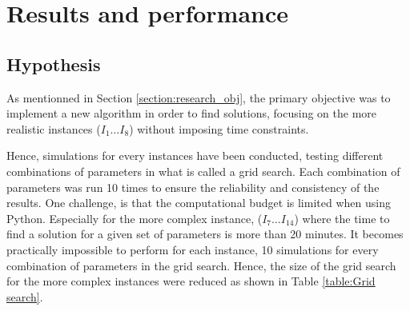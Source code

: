 \chapter{Results and performance}
\label{Chapter5}



\section{Hypothesis}
As mentionned in Section \ref{section:research_obj}, the primary objective was to implement a new algorithm in order to find solutions, focusing on the more realistic instances ($I_1 \ldots I_8$) without imposing time constraints.

Hence, simulations for every instances have been conducted, testing different combinations of parameters in what is called a grid search. Each combination of parameters was run 10 times to ensure the reliability and consistency of the results.
One challenge, is that the computational budget is limited when using Python. Especially for the more complex instance, ($I_7 \ldots I_{14}$) where the time to find a solution for a given set of parameters is more than 20 minutes. It becomes practically impossible to perform for each instance, 10 simulations for every combination of parameters in the grid search. Hence, the size of the grid search for the more complex instances were reduced as shown in Table \ref{table:Grid search}.

